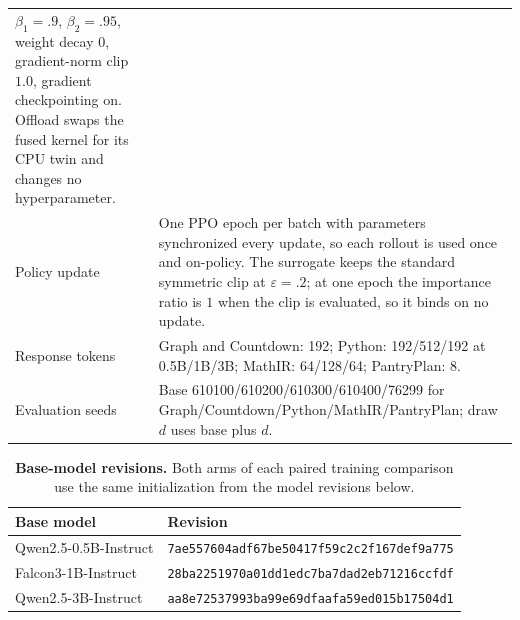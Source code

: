 \documentclass{article}
\newcommand{\1}{\mathbf 1}
\theoremstyle{remark}
\theoremstyle{definition}
\theoremstyle{plain}
\begin{document}
\begin{table}[!htbp]
\begin{tabularx}{\linewidth}{@{}P{.23\linewidth}Y@{}}
      $\beta_1=.9$, $\beta_2=.95$, weight decay $0$, gradient-norm clip $1.0$,
      gradient checkpointing on. Offload swaps the fused kernel for its CPU
      twin and changes no hyperparameter. \\
    Policy update & One PPO epoch per batch with parameters synchronized every
      update, so each rollout is used once and on-policy. The surrogate keeps
      the standard symmetric clip at $\varepsilon=.2$; at one epoch the
      importance ratio is $1$ when the clip is evaluated, so it binds on no
      update. \\
    Response tokens & Graph and Countdown: 192; Python: 192/512/192
      at 0.5B/1B/3B; MathIR: 64/128/64; PantryPlan: 8. \\
    Evaluation seeds & Base 610100/610200/610300/610400/76299 for
      Graph/Countdown/Python/MathIR/PantryPlan; draw $d$ uses base plus $d$. \\
    \bottomrule
  \end{tabularx}
\end{table}

\begin{table}[!htbp]
\centering
\caption{\textbf{Base-model revisions.} Both arms of each paired training
comparison use the same initialization from the model revisions below.}
\label{tab:pinned-revisions}
\small
\begin{tabular}{@{}ll@{}}
\toprule
\textbf{Base model} & \textbf{Revision} \\
\midrule
Qwen2.5-0.5B-Instruct & {\scriptsize\texttt{7ae557604adf67be50417f59c2c2f167def9a775}} \\
Falcon3-1B-Instruct & {\scriptsize\texttt{28ba2251970a01dd1edc7ba7dad2eb71216ccfdf}} \\
Qwen2.5-3B-Instruct & {\scriptsize\texttt{aa8e72537993ba99e69dfaafa59ed015b17504d1}} \\
\bottomrule
\end{tabular}
\end{table}
\end{document}
